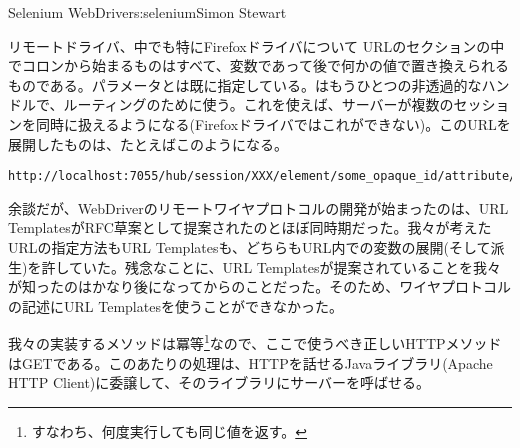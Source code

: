\begin{aosachapter}{Selenium WebDriver}{s:selenium}{Simon Stewart}
\begin{aosasect1}{リモートドライバ、中でも特にFirefoxドライバについて}
\noindent URLのセクションの中でコロンから始まるものはすべて、変数であって後で何かの値で置き換えられるものである。パラメータとは既に指定している。はもうひとつの非透過的なハンドルで、ルーティングのために使う。これを使えば、サーバーが複数のセッションを同時に扱えるようになる(Firefoxドライバではこれができない)。このURLを展開したものは、たとえばこのようになる。

\begin{verbatim}
http://localhost:7055/hub/session/XXX/element/some_opaque_id/attribute/row
\end{verbatim}

余談だが、WebDriverのリモートワイヤプロトコルの開発が始まったのは、URL TemplatesがRFC草案として提案されたのとほぼ同時期だった。我々が考えたURLの指定方法もURL Templatesも、どちらもURL内での変数の展開(そして派生)を許していた。残念なことに、URL Templatesが提案されていることを我々が知ったのはかなり後になってからのことだった。そのため、ワイヤプロトコルの記述にURL Templatesを使うことができなかった。

我々の実装するメソッドは冪等\footnote{すなわち、何度実行しても同じ値を返す。}なので、ここで使うべき正しいHTTPメソッドはGETである。このあたりの処理は、HTTPを話せるJavaライブラリ(Apache HTTP Client)に委譲して、そのライブラリにサーバーを呼ばせる。



\end{aosasect1}
\end{aosachapter}
